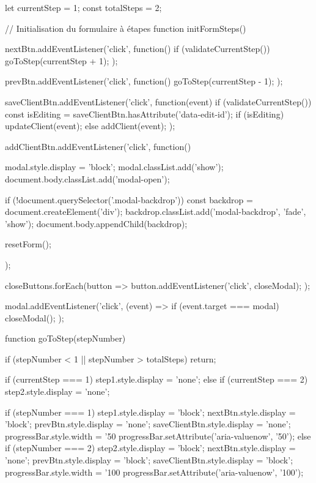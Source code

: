 {    let currentStep = 1;
    const totalSteps = 2;

    // Initialisation du formulaire à étapes
    function initFormSteps() {
        nextBtn.addEventListener('click', function() {
            if (validateCurrentStep()) {
                goToStep(currentStep + 1);
            }
        });

        prevBtn.addEventListener('click', function() {
            goToStep(currentStep - 1);
        });

        saveClientBtn.addEventListener('click', function(event) {
            if (validateCurrentStep()) {
                const isEditing = saveClientBtn.hasAttribute('data-edit-id');
                if (isEditing) {
                    updateClient(event);
                } else {
                    addClient(event);
                }
            }
        });

        addClientBtn.addEventListener('click', function() {
            modal.style.display = 'block';
            modal.classList.add('show');
            document.body.classList.add('modal-open');

            if (!document.querySelector('.modal-backdrop')) {
                const backdrop = document.createElement('div');
                backdrop.classList.add('modal-backdrop', 'fade', 'show');
                document.body.appendChild(backdrop);
            }

            resetForm();
        });

        closeButtons.forEach(button => {
            button.addEventListener('click', closeModal);
        });

        modal.addEventListener('click', (event) => {
            if (event.target === modal) {
                closeModal();
            }
        });
    }

    function goToStep(stepNumber) {
        if (stepNumber < 1 || stepNumber > totalSteps) return;

        if (currentStep === 1) {
            step1.style.display = 'none';
        } else if (currentStep === 2) {
            step2.style.display = 'none';
        }

        if (stepNumber === 1) {
            step1.style.display = 'block';
            nextBtn.style.display = 'block';
            prevBtn.style.display = 'none';
            saveClientBtn.style.display = 'none';
            progressBar.style.width = '50%
            progressBar.setAttribute('aria-valuenow', '50');
        } else if (stepNumber === 2) {
            step2.style.display = 'block';
            nextBtn.style.display = 'none';
            prevBtn.style.display = 'block';
            saveClientBtn.style.display = 'block';
            progressBar.style.width = '100%
            progressBar.setAttribute('aria-valuenow', '100');
        }

}}

